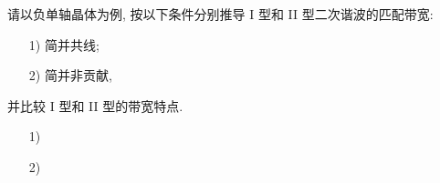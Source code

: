 \documentclass{assignment}
\begin{document}
\begin{prob}
    请以负单轴晶体为例, 按以下条件分别推导 I 型和 II 型二次谐波的匹配带宽:
    \begin{itemize}
        \item[1)] 简并共线;
        \item[2)] 简并非贡献,
    \end{itemize}
    并比较 I 型和 II 型的带宽特点.
\end{prob}
\begin{pf}
    \begin{itemize}
        \item[1)] 
        \item[2)] 
    \end{itemize}
\end{pf}
\end{document}
